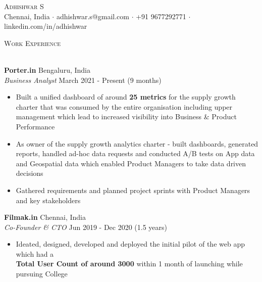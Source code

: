 \documentclass[a4paper]{article}
\newcommand{\lineunder} {
    \vspace*{-8pt} \\
    \hspace*{-18pt} \hrulefill \\
}
\newcommand{\header} [1] {
    {\hspace*{-18pt}\vspace*{6pt} \textsc{#1}}
    \vspace*{-6pt} \lineunder
}
\begin{document}
\vspace*{-40pt}

    

\vspace*{-10pt}
\begin{center}
    {\Huge \scshape {Adhishwar S}}\\
    Chennai, India $\cdot$ adhishwar.s@gmail.com $\cdot$ +91 9677292771 $\cdot$ linkedin.com/in/adhishwar\\
\end{center}

\header{Work Experience}
\vspace{1mm}


\textbf{Porter.in} \hfill Bengaluru, India\\
\textit{Business Analyst} \hfill March 2021 - Present (9 months)\\
\vspace{-1mm}
\begin{itemize} \itemsep 1pt
    \item Built a unified dashboard of around \textbf{25 metrics} for the supply growth charter that was consumed by the entire organisation including upper management which lead to increased visibility into Business \& Product Performance
    \item As owner of the supply growth analytics charter - built dashboards, generated reports, handled ad-hoc data requests and conducted A/B tests on App data and Geospatial data which enabled Product Managers to take data driven decisions
    \item Gathered requirements and planned project sprints with Product Managers and key stakeholders
\end{itemize}
\textbf{Filmak.in} \hfill Chennai, India\\
\textit{Co-Founder \& CTO} \hfill Jun 2019 - Dec 2020 (1.5 years)\\
\vspace{-1mm}
\begin{itemize} \itemsep 1pt
    \item Ideated, designed, developed and deployed the initial pilot of the web app which had a\\ \textbf{Total User Count of around 3000} within 1 month of launching while pursuing College
\end{itemize}
\end{document}
